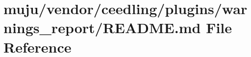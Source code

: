 \hypertarget{vendor_2ceedling_2plugins_2warnings__report_2_r_e_a_d_m_e_8md}{}\section{muju/vendor/ceedling/plugins/warnings\+\_\+report/\+R\+E\+A\+D\+ME.md File Reference}
\label{vendor_2ceedling_2plugins_2warnings__report_2_r_e_a_d_m_e_8md}
